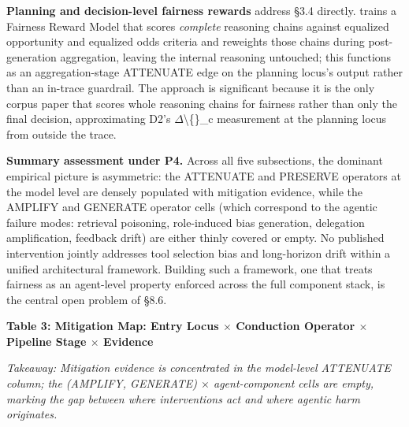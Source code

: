 \documentclass[10pt]{article}
\begin{document}
\textbf{Planning and decision-level fairness rewards} address \S{}3.4 directly. \cite{hall2025guiding} trains a Fairness Reward Model that scores \emph{complete} reasoning chains against equalized opportunity and equalized odds criteria and reweights those chains during post-generation aggregation, leaving the internal reasoning untouched; this functions as an aggregation-stage ATTENUATE edge on the planning locus's output rather than an in-trace guardrail. The approach is significant because it is the only corpus paper that scores whole reasoning chains for fairness rather than only the final decision, approximating D2's $\Delta$\textbackslash\{\}\_c measurement at the planning locus from outside the trace.

\textbf{Summary assessment under P4.} Across all five subsections, the dominant empirical picture is asymmetric: the ATTENUATE and PRESERVE operators at the model level are densely populated with mitigation evidence, while the AMPLIFY and GENERATE operator cells (which correspond to the agentic failure modes: retrieval poisoning, role-induced bias generation, delegation amplification, feedback drift) are either thinly covered or empty. No published intervention jointly addresses tool selection bias and long-horizon drift within a unified architectural framework. Building such a framework, one that treats fairness as an agent-level property enforced across the full component stack, is the central open problem of \S{}8.6.


\textbf{Table 3: Mitigation Map: Entry Locus $\times$ Conduction Operator $\times$ Pipeline Stage $\times$ Evidence}

\emph{Takeaway: Mitigation evidence is concentrated in the model-level ATTENUATE column; the (AMPLIFY, GENERATE) $\times$ agent-component cells are empty, marking the gap between where interventions act and where agentic harm originates.}
\end{document}
